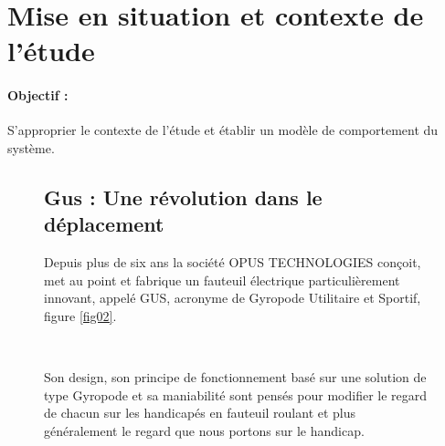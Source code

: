 

\section{Mise en situation et contexte de l'étude}

\paragraph{Objectif :} S'approprier le contexte de l'étude et établir un modèle de comportement du système.

\begin{figure}[ht!]
\begin{minipage}{0.65\linewidth}
\subsection{Gus : Une révolution dans le déplacement}

Depuis plus de six ans la société OPUS TECHNOLOGIES conçoit, met au point et fabrique un fauteuil électrique particulièrement innovant, appelé GUS, acronyme de Gyropode Utilitaire et Sportif, figure \ref{fig02}.

~\

Son design, son principe de fonctionnement basé sur une solution de type Gyropode et sa maniabilité sont pensés pour modifier le regard de chacun sur les handicapés en fauteuil roulant et plus généralement le regard que nous portons sur le handicap.

~\


\end{minipage}
\end{figure}
